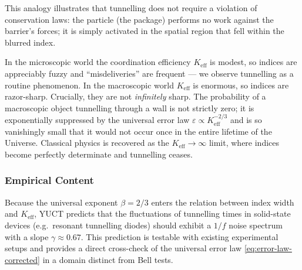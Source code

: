 \documentclass[12pt,a4paper]{article}
\theoremstyle{remark}
\begin{document}
	\medskip
	\medskip
	
	This analogy illustrates that tunnelling does not require a
	violation of conservation laws: the particle (the package) performs
	no work against the barrier's forces; it is simply activated in
	the spatial region that fell within the blurred index.  
	
	In the microscopic world the coordination efficiency
	\(K_{\mathrm{eff}}\) is modest, so indices are appreciably fuzzy
	and ``misdeliveries'' are frequent --- we observe tunnelling as a
	routine phenomenon.  In the macroscopic world \(K_{\mathrm{eff}}\)
	is enormous, so indices are razor-sharp.  Crucially, they are not
	\emph{infinitely} sharp.  The probability of a macroscopic object
	tunnelling through a wall is not strictly zero; it is exponentially
	suppressed by the universal error law
	\(\varepsilon \propto K_{\mathrm{eff}}^{-2/3}\) and is so
	vanishingly small that it would not occur once in the entire
	lifetime of the Universe.  Classical physics is recovered as the
	\(K_{\mathrm{eff}} \to \infty\) limit, where indices become
	perfectly determinate and tunnelling ceases.
	
	\subsubsection{Empirical Content}
	
	Because the universal exponent $\beta=2/3$ enters the relation between
	index width and $K_{\mathrm{eff}}$, YUCT predicts that the
	fluctuations of tunnelling times in solid-state devices (e.g.\
	resonant tunnelling diodes) should exhibit a $1/f$ noise spectrum
	with a slope $\gamma \approx 0.67$.  This prediction is testable with
	existing experimental setups and provides a direct cross-check of the
	universal error law \eqref{eq:error-law-corrected} in a domain distinct from
	Bell tests.
	
\end{document}
